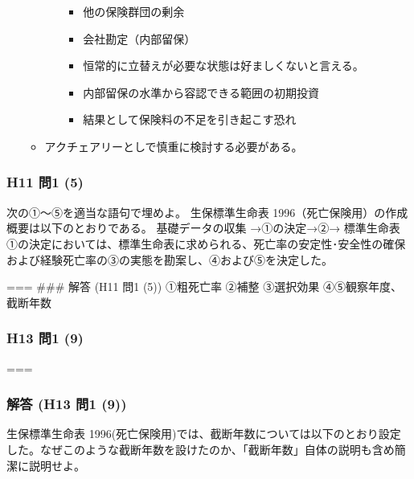 \documentclass[]{article}
\begin{document}
\begin{itemize}
\begin{itemize}
\begin{itemize}
\begin{itemize}
                \item
              他の保険群団の剰余
            \item
              会社勘定（内部留保）
              \item
            恒常的に立替えが必要な状態は好ましくないと言える。
          \item
            内部留保の水準から容認できる範囲の初期投資
          \item
            結果として保険料の不足を引き起こす恐れ
          
        \end{itemize}
      \end{itemize}
    \item
      アクチェアリーとしで慎重に検討する必要がある。
    
  \end{itemize}
\end{itemize}

\hypertarget{h11-ux554f1-5}{%
\subsubsection{H11 問1 (5)}\label{h11-ux554f1-5}}

次の①～⑤を適当な語句で埋めよ。 生保標準生命表
1996（死亡保険用）の作成概要は以下のとおりである。 基礎データの収集
→①の決定→②→ 標準生命表
①の決定においては、標準生命表に求められる、死亡率の安定性･安全性の確保および経験死亡率の③の実態を勘案し、④および⑤を決定した。

=== \#\#\# 解答 (H11 問1 (5)) ①粗死亡率 ②補整 ③選択効果
④⑤観察年度、截断年数

\hypertarget{h13-ux554f1-9}{%
\subsubsection{H13 問1 (9)}\label{h13-ux554f1-9}}

===

\hypertarget{ux89e3ux7b54-h13-ux554f1-9}{%
\subsubsection{解答 (H13 問1 (9))}\label{ux89e3ux7b54-h13-ux554f1-9}}

生保標準生命表
1996(死亡保険用)では、截断年数については以下のとおり設定した。なぜこのような截断年数を設けたのか、「截断年数」自体の説明も含め簡潔に説明せよ。
\end{document}
